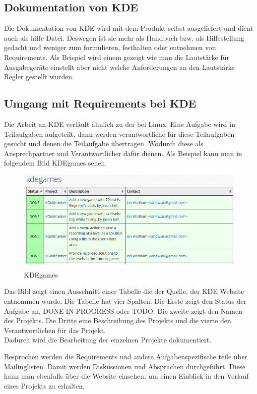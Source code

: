 \subsection{Dokumentation von KDE}
Die Dokumentation von KDE wird mit dem Produkt selbst ausgeliefert und dient
auch als hilfe Datei. Deswegen ist sie mehr als Handbuch bzw. als Hilfestellung
gedacht und weniger zum formulieren, festhalten oder entnehmen von Requirements.
Als Beispiel wird einem gezeigt wie man die Lautstärke für Ausgabegeräte
einstellt aber nicht welche Anforderungen an den Lautstärke Regler gestellt
wurden\cite{4}.

\subsection{Umgang mit Requirements bei KDE}
Die Arbeit an KDE verläuft ähnlich zu der bei Linux. Eine Aufgabe wird in
Teilaufgaben aufgeteilt, dann werden verantwortliche für diese Teilaufgaben
gesucht und denen die Teilaufgabe übertragen. Wodurch diese als Ansprechpartner
und Verantwortlicher dafür dienen. Als Beispiel kann man in folgendem Bild
KDEgames sehen.
%
\begin{figure}[h]
\includegraphics[width=\columnwidth]{images/KDE_games.png}
\caption{KDEgames\cite{5}}
\end{figure}
Das Bild zeigt einen Ausschnitt einer Tabelle die der Quelle, der KDE
Website entnommen wurde\cite{5}.
Die Tabelle hat vier Spalten. Die Erste zeigt den Status der Aufgabe an, DONE
IN PROGRESS oder TODO. Die zweite zeigt den Namen des Projekts. Die Dritte eine Beschreibung des Projekts und die vierte den Verantwortlichen für das Projekt.\\
Dadurch wird die Bearbeitung der einzelnen Projekte dokumentiert.

Besprochen werden die Requirements und andere Aufgabenspezifische teile über Mailinglisten. Damit werden Diskussionen und Absprachen durchgeführt.
Diese kann man ebenfalls über die Website einsehen, um einen Einblick in den
Verlauf eines Projekts zu erhalten.

